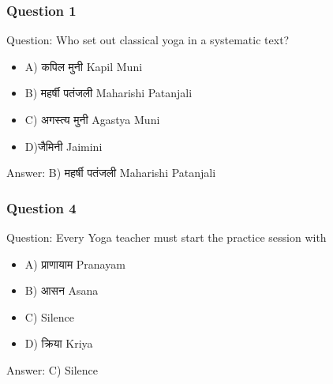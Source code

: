 \begin{frame}[fragile]\frametitle{Question 1}
Question: Who set out classical yoga in a systematic text?
\begin{itemize}
\item A) कपिल मुनी Kapil Muni
\item B) महर्षी पतंजली  Maharishi Patanjali
\item C) अगस्त्य मुनी Agastya Muni
\item D)जैमिनी Jaimini
\end{itemize}
Answer: B) महर्षी पतंजली  Maharishi Patanjali
\end{frame}



\begin{frame}[fragile]\frametitle{Question 4}
Question: Every Yoga teacher must start the practice session with
\begin{itemize}
\item A) प्राणायाम Pranayam
\item B) आसन Asana
\item C) Silence
\item D) क्रिया Kriya
\end{itemize}
Answer: C) Silence
\end{frame}

